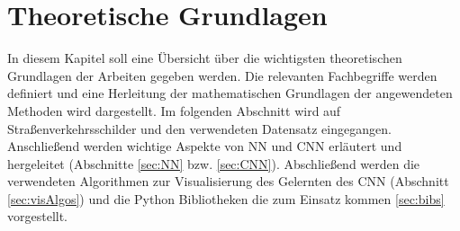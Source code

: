 \newpage
\section{Theoretische Grundlagen} \label{infos}
In diesem Kapitel soll eine Übersicht über die wichtigsten theoretischen Grundlagen der Arbeiten gegeben werden. Die relevanten Fachbegriffe werden definiert und eine Herleitung der mathematischen Grundlagen der angewendeten Methoden wird dargestellt. Im folgenden Abschnitt wird auf Straßenverkehrsschilder und den verwendeten Datensatz eingegangen.  Anschließend werden wichtige Aspekte von \ac{NN} und \ac{CNN} erläutert und hergeleitet (Abschnitte \ref{sec:NN} bzw. \ref{sec:CNN}). Abschließend werden die verwendeten Algorithmen zur Visualisierung des Gelernten des \ac{CNN} (Abschnitt \ref{sec:visAlgos}) und die Python Bibliotheken die zum Einsatz kommen \ref{sec:bibs} vorgestellt. 
 




